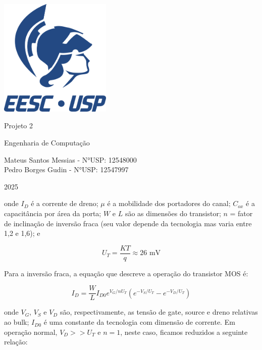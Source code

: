 ﻿\documentclass[12pt,a4paper]{article}
\newcommand{\imprimirTitulo}{Projeto 2}
\newcommand{\imprimirSubtitulo}{Engenharia de Computação}
\newcommand{\imprimirAutores}{Mateus Santos Messias - N°USP: 12548000 \\ Pedro Borges Gudin - N°USP: 12547997}
\newcommand{\imprimirAno}{2025}
\begin{document}
\hypersetup{pageanchor=false}
\begin{titlepage}
    \begin{center}
        \vspace*{0.5cm}
        \includegraphics[width=0.4\textwidth]{images/Logo EESC-USP - Vertical Monocromatico Azul (ECM).png}
        \vfill
        {\Huge \imprimirTitulo \par}
        \vspace{0.5cm}
        {\Large \imprimirSubtitulo \par}
        \vspace{1cm}
        {\large \imprimirAutores \par}
        \vfill
        {\large \imprimirAno \par}
    \end{center}
\end{titlepage}
\newpage

onde $I_D$ é a corrente de dreno; $\mu$ é a mobilidade dos portadores do canal; $C_{ox}$ é a capacitância por área da porta; $W$ e $L$ são as dimensões do transistor; $n$ = fator de inclinação de inversão fraca (seu valor depende da tecnologia mas varia entre 1,2 e 1,6); e

\begin{equation}
U_T = \frac{KT}{q} \approx 26 \text{ mV}
\end{equation}

Para a inversão fraca, a equação que descreve a operação do transistor MOS é:

\begin{equation}
I_D = \frac{W}{L} I_{D0} e^{V_G/nU_T} \left( e^{-V_S/U_T} - e^{-V_D/U_T} \right)
\end{equation}

onde $V_G$, $V_S$ e $V_D$ são, respectivamente, as tensão de gate, source e dreno relativas ao bulk; $I_{D0}$ é uma constante da tecnologia com dimensão de corrente. Em operação normal, $V_D >> U_T$ e $ n = 1$, neste caso, ficamos reduzidos a seguinte relação:
\end{document}
